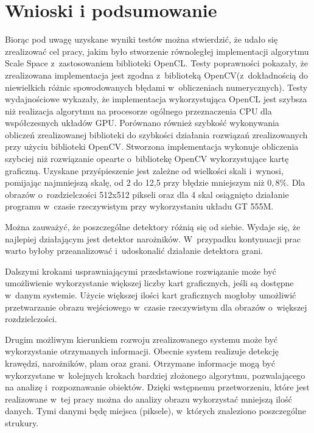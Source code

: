 \chapter{Wnioski i podsumowanie}
\label{cha:podsumowanie}

Biorąc pod uwagę uzyskane wyniki testów można stwierdzić, że udało się zrealizować cel pracy, jakim było stworzenie równoległej implementacji algorytmu Scale Space z~zastosowaniem biblioteki OpenCL. Testy poprawności pokazały, że zrealizowana implementacja jest zgodna z~biblioteką OpenCV(z~dokładnością do niewielkich różnic spowodowanych błędami w~obliczeniach numerycznych). Testy wydajnościowe wykazały, że implementacja wykorzystująca OpenCL jest szybsza niż realizacja algorytmu na procesorze ogólnego przeznaczenia CPU dla współczesnych układów GPU. Porównano również szybkość wykonywania obliczeń zrealizowanej biblioteki do szybkości działania rozwiązań zrealizowanych przy użyciu biblioteki OpenCV. Stworzona implementacja wykonuje obliczenia szybciej niż rozwiązanie opearte o~bibliotekę OpenCV wykorzystujące kartę graficzną. Uzyskane przyśpieszenie jest zależne od wielkości skali i~wynosi, pomijając najmniejszą skalę, od 2 do 12,5 przy błędzie mniejszym niż $ 0,8\% $. Dla obrazów o~rozdzielczości 512x512 pikseli oraz dla 4 skal osiągnięto działanie programu w~czasie rzeczywistym przy wykorzystaniu układu GT 555M.

Można zauważyć, że poszczególne detektory różnią się od siebie. Wydaje się, że najlepiej działającym jest detektor narożników. W~przypadku kontynuacji prac warto byłoby przeanalizować i~udoskonalić działanie detektora grani.

Dalszymi krokami usprawniającymi przedstawione rozwiązanie może być umożliwienie wykorzystanie większej liczby kart graficznych, jeśli są dostępne w~danym systemie. Użycie większej ilości kart graficznych mogłoby umożliwić przetwarzanie obrazu wejściowego w~czasie rzeczywistym dla obrazów o~większej rozdzielczości.

Drugim możliwym kierunkiem rozwoju zrealizowanego systemu może być wykorzystanie otrzymanych informacji. Obecnie system realizuje detekcję krawędzi, narożników, plam oraz grani. Otrzymane informacje mogą być wykorzystane w~kolejnych krokach bardziej złożonego algorytmu, pozwalającego na analizę i~rozpoznawanie obiektów. Dzięki wstępnemu przetworzeniu, które jest realizowane w~tej pracy można do analizy obrazu wykorzystać mniejszą ilość danych. Tymi danymi będę miejsca (piksele), w~których znaleziono poszczególne strukury.
